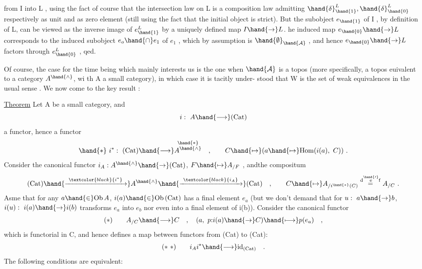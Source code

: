 from I into L ,  using the fact of course that the intersection law on L
 is a composition law admitting $\hand{\delta}^{L}_{\hand{1}} ,\hand{\delta}^{L}_{\hand{0}}$ respectively as unit and
as zero element (still using the fact that the initial object is strict).
 But the subobject $e_{\hand{1}}$ of I ,  by definition of L,  can be viewed as the
 inverse image of $e^{L}_{\hand{1}}$ by a uniquely defined map $I \hand{\to} L$.  he induced
 map $e_{\hand{0}} \hand{\to} L$ corresponds to the induced subobject $e_{o}\hand{\cap} e_{1}$ of $e_{1}$ ,
which by assumption is $\hand{\emptyset}_{\hand{\mathcal{A}}}$ ,  and hence $e_{\hand{0}} \hand{\to} L$ factors through $e^{L}_{\hand{0}}$ ,  qed.

Of course,  the case for the time being which mainly interests us is
the one when $\hand{\mathcal{A}}$ is a topos (more specifically, a topos euivalent to a
category $A^{\hand{\wedge}}$, wi th A a small category),  in which case it is tacitly under-%
stood that W is the set of weak equivalences in the usual sense .  We now
come to the key result :

\uline{Theorem}  Let A be a small category,  and
\[ i:\ A \hand{\longrightarrow} (\mathrm{Cat}) \]
a functor,  hence a functor
\[ \hand{*}\ i^{*} :\ (\mathrm{Cat}) \hand{\longrightarrow} \overset{\hand{*}}{A^{\hand{\wedge}}} \quad ,\qquad C \hand{\mapsto} (a \hand{\mapsto} \mathrm{Hom}(i(a),\ C)) \ . \]
Consider the canonical functor  $i_{A} : A^{\hand{\wedge}} \hand{\to} (\mathrm{Cat})$,  $F \hand{\mapsto} A_{/F}$ ,  and\hand{/}the
compositum
\[ (\mathrm{Cat}) \hand{\xrightarrow{\ \textcolor{black}{i^{*}}\ }} A^{\hand{\wedge}} \hand{\xrightarrow{\ \textcolor{black}{i_{A}}\ }} (\mathrm{Cat}) \quad ,\qquad C \hand{\mapsto} A_{/i^{\hand{*}}(C)} \overset{\mathrm{d}\overset{\hand{\scriptscriptstyle\prime}}{\mathrm{e}}\mathrm{f}}{=} A_{/C} \ . \]
Asme that for any $a \hand{\in} \mathrm{Ob}\, A$,  $i(a) \hand{\in} \mathrm{Ob}\, (\mathrm{Cat})$ has a final element $e_{a}$ (but
we don't demand that for $u:\ a \hand{\to} b$,  $i(u):\ i(a) \hand{\to} i(b)$ transforms $e_{a}$ into
$e_{b}$ nor even into a final element of i(b)).  Consider the canonical
functor
\[ (*) \qquad A_{/C} \hand{\longrightarrow} C \quad , \quad (a,\ p{:}i(a) \hand{\to} C) \hand{\longmapsto} p(e_{a}) \quad , \]
which is functorial in C,  and hence defines a map between functors from
(Cat) to (Cat):
\[ (*\ *) \qquad i_{A}i^{*} \hand{\longrightarrow} \mathrm{id}_{(\mathrm{Cat})} \quad . \]
The following conditions  are equivalent:

